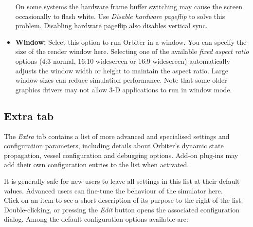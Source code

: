 \documentclass[Orbiter User Manual.tex]{subfiles}
\begin{document}
\begin{itemize}
On some systems the hardware frame buffer switching may cause the screen occasionally to flash white. Use \textit{Disable hardware pageflip} to solve this problem. Disabling hardware pageflip also disables vertical sync.
\item \textbf{Window:} Select this option to run Orbiter in a window. You can specify the size of the render window here. Selecting one of the available \textit{fixed aspect ratio} options (4:3 normal, 16:10 widescreen or 16:9 widescreen) automatically adjusts the window width or height to maintain the aspect ratio. Large window sizes can reduce simulation performance. Note that some older graphics drivers may not allow 3-D applications to run in window mode.
\end{itemize}


\subsection{Extra tab}
The \textit{Extra} tab contains a list of more advanced and specialised settings and configuration parameters, including details about Orbiter's dynamic state propagation, vessel configuration and debugging options. Add-on plug-ins may add their own configuration entries to the list when activated.

\begin{figure}[H]
	\centering
\end{figure}

\noindent
It is generally safe for new users to leave all settings in this list at their default values. Advanced users can fine-tune the behaviour of the simulator here.\\
Click on an item to see a short description of its purpose to the right of the list. Double-clicking, or pressing the \textit{Edit} button opens the associated configuration dialog. Among the default configuration options available are:
\end{document}
